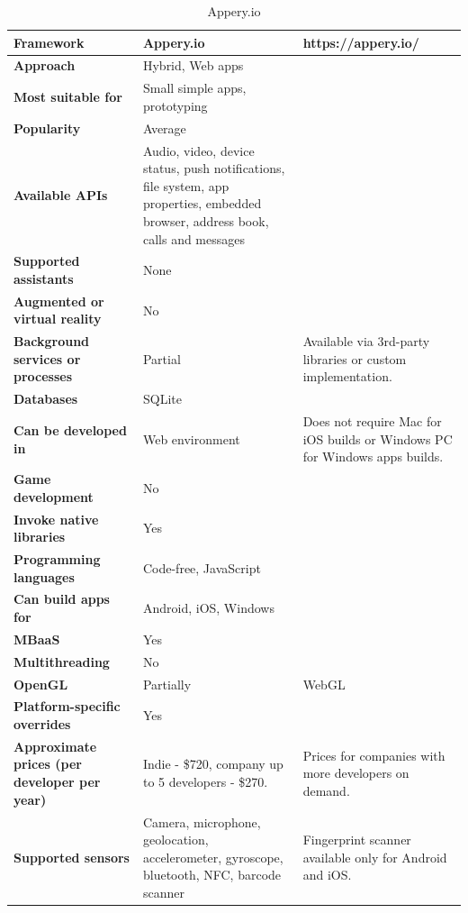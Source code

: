 \documentclass[english,master,public,dept460,male,cpdeclaration,oneside]{diploma}
\begin{document}
\begin{table}[!h]
	\centering
	\caption{Appery.io}
	\begin{tabular}{p{} | p{} | p{}}
		\toprule		
		\textbf{Framework} & \textbf{Appery.io} & https://appery.io/ \\
		\midrule
		\textbf{Approach} & Hybrid, Web apps & \\			
		\midrule	
		\textbf{Most suitable for} &  Small simple apps, prototyping & \\
		\midrule
		\textbf{Popularity} & Average & \\			
		\midrule
		\textbf{Available APIs} & Audio, video, device status, push notifications, file system, app properties, embedded browser, address book, calls and messages & \\			
		\midrule
		\textbf{Supported assistants} & None & \\			
		\midrule
		\textbf{Augmented or virtual reality} & No & \\			
		\midrule
		\textbf{Background services or processes} & Partial & Available via 3rd-party libraries or custom implementation. \\			
		\midrule
		\textbf{Databases} & SQLite & \\			
		\midrule
		\textbf{Can be developed in} & Web environment & Does not require Mac for iOS builds or Windows PC for Windows apps builds. \\			
		\midrule
		\textbf{Game development} & No & \\			
		\midrule
		\textbf{Invoke native libraries} & Yes & \\			
		\midrule
		\textbf{Programming languages} & Code-free, JavaScript & \\			
		\midrule
		\textbf{Can build apps for} & Android, iOS, Windows & \\			
		\midrule
		\textbf{MBaaS} & Yes & \\			
		\midrule
		\textbf{Multithreading} & No & \\			
		\midrule
		\textbf{OpenGL} & Partially &  WebGL \\			
		\midrule
		\textbf{Platform-specific overrides} & Yes & \\			
		\midrule
		\textbf{Approximate prices (per developer per year)} & Indie - \$720, company up to 5 developers - \$270. & Prices for companies with more developers on demand. \\			
		\midrule
		\textbf{Supported sensors} & Camera, microphone, geolocation, accelerometer, gyroscope, bluetooth, NFC, barcode scanner & Fingerprint scanner available only for Android and iOS.\\			
		\midrule
	\end{tabular}
\end{table}
\end{document}
